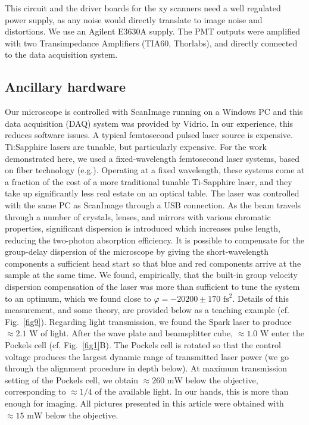\documentclass[10pt,letterpaper]{article}
\begin{document}
This circuit and the driver boards for the xy scanners need a well regulated power supply, as any noise would directly translate to image noise and distortions. We use an Agilent E3630A supply. The PMT outputs were amplified with two Transimpedance Amplifiers (TIA60, Thorlabs), and directly connected to the data acquisition system.

\subsection*{Ancillary hardware}
Our microscope is controlled with ScanImage \cite{Pologruto2003} running on a Windows PC and this data acquisition (DAQ) system was provided by Vidrio. In our experience, this reduces software issues.\newline
A typical femtosecond pulsed laser source is expensive. Ti:Sapphire lasers are tunable, but particularly expensive. For the work demonstrated here, we used a fixed-wavelength femtosecond laser systems, based on fiber technology (e.g.\cite{Bueno2019,Limpert2006,Wise2012,Young2015}). Operating at a fixed wavelength, these systems come at a fraction of the cost of a more traditional tunable Ti-Sapphire laser, and they take up significantly less real estate on an optical table. The laser was controlled with the same PC as ScanImage through a USB connection. As the beam travels through a number of crystals, lenses, and mirrors with various chromatic properties, significant dispersion is introduced which increases pulse length, reducing the two-photon absorption efficiency. It is possible to compensate for the group-delay dispersion of the microscope by giving the short-wavelength components a sufficient head start so that blue and red components arrive at the sample at the same time. We found, empirically, that the built-in group velocity dispersion compensation of the laser was more than sufficient to tune the system to an optimum, which we found close to $\varphi=-20200\pm170\text{ fs}^2$. Details of this measurement, and some theory, are provided below as a teaching example (cf. Fig.~\ref{fig9}). Regarding light transmission, we found the Spark laser to produce $\approx 2.1\text{ W}$ of light. After the wave plate and beamsplitter cube, $\approx 1.0\text{ W}$ enter the Pockels cell (cf. Fig.~\ref{fig1}B). The Pockels cell is rotated so that the control voltage produces the largest dynamic range of transmitted laser power (we go through the alignment procedure in depth below). At maximum transmission setting of the Pockels cell, we obtain $\approx 260\text{ mW}$ below the objective, corresponding to $\approx1/4$ of the available light. In our hands, this is more than enough for imaging. All pictures presented in this article were obtained with $\approx 15\text{ mW}$ below the objective.
\end{document}
